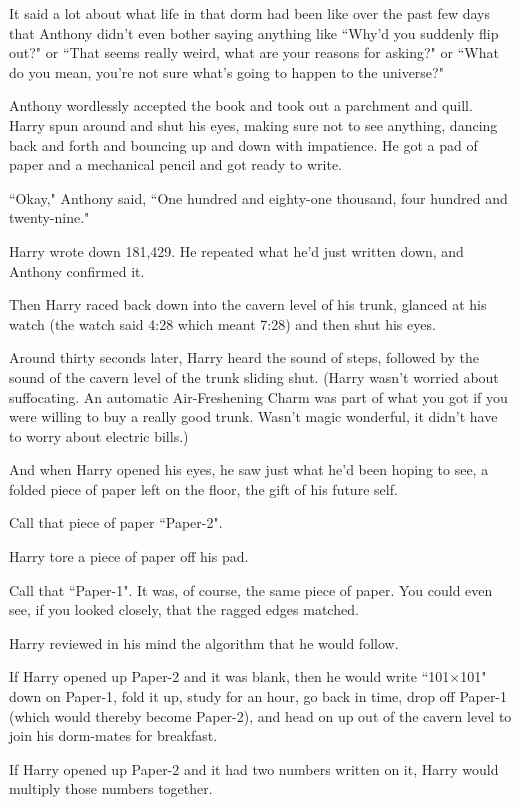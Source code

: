 It said a lot about what life in that dorm had been like over the past few days that Anthony didn't even bother saying anything like ``Why'd you suddenly flip out?" or ``That seems really weird, what are your reasons for asking?" or ``What do you mean, you're not sure what's going to happen to the universe?"

Anthony wordlessly accepted the book and took out a parchment and quill. Harry spun around and shut his eyes, making sure not to see anything, dancing back and forth and bouncing up and down with impatience. He got a pad of paper and a mechanical pencil and got ready to write.

``Okay," Anthony said, ``One hundred and eighty-one thousand, four hundred and twenty-nine."

Harry wrote down 181,429. He repeated what he'd just written down, and Anthony confirmed it.

Then Harry raced back down into the cavern level of his trunk, glanced at his watch (the watch said 4:28 which meant 7:28) and then shut his eyes.

Around thirty seconds later, Harry heard the sound of steps, followed by the sound of the cavern level of the trunk sliding shut. (Harry wasn't worried about suffocating. An automatic Air-Freshening Charm was part of what you got if you were willing to buy a really good trunk. Wasn't magic wonderful, it didn't have to worry about electric bills.)

And when Harry opened his eyes, he saw just what he'd been hoping to see, a folded piece of paper left on the floor, the gift of his future self.

Call that piece of paper ``Paper-2".

Harry tore a piece of paper off his pad.

Call that ``Paper-1". It was, of course, the same piece of paper. You could even see, if you looked closely, that the ragged edges matched.

Harry reviewed in his mind the algorithm that he would follow.

If Harry opened up Paper-2 and it was blank, then he would write ``101$\times$101" down on Paper-1, fold it up, study for an hour, go back in time, drop off Paper-1 (which would thereby become Paper-2), and head on up out of the cavern level to join his dorm-mates for breakfast.

If Harry opened up Paper-2 and it had two numbers written on it, Harry would multiply those numbers together.

